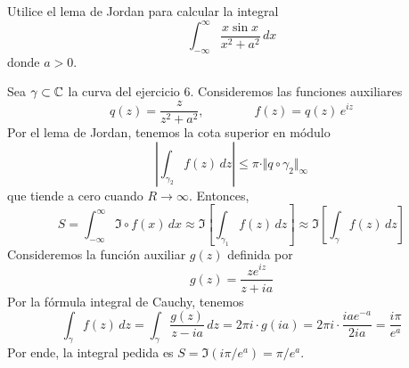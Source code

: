 \begin{exercise}
Utilice el lema de Jordan para calcular la integral
$$\int_{-\infty}^\infty \frac {x \sin x} {x^2 + a^2} \, dx$$
donde $a > 0$.
\end{exercise}

\begin{solution}
Sea $\gamma \subset \mathbb C$ la curva del ejercicio 6. Consideremos las funciones auxiliares
$$q(z) = \frac z {z^2 + a^2}, \qquad \qquad f(z) = q(z) \, e^{iz}$$
Por el lema de Jordan, tenemos la cota superior en módulo
$$\left| \int_{\gamma_2} f(z) \, dz \right| \le \pi \cdot \Vert q \circ \gamma_2 \Vert_\infty$$
que tiende a cero cuando $R \to \infty$. Entonces,
$$
S
    = \int_{-\infty}^\infty \Im \circ f(x) \, dx
    \approx \Im \left[ \int_{\gamma_1} f(z) \, dz \right]
    \approx \Im \left[ \int_\gamma f(z) \, dz \right]$$
Consideremos la función auxiliar $g(z)$ definida por
$$
g(z) = \frac {ze^{iz}} {z + ia}
$$
Por la fórmula integral de Cauchy, tenemos
$$
\int_\gamma f(z) \, dz
    = \int_\gamma \frac {g(z)} {z - ia} \, dz
    = 2\pi i \cdot g(ia)
    = 2\pi i \cdot \frac {iae^{-a}} {2ia}
    = \frac {i\pi} {e^a}
$$
Por ende, la integral pedida es $S = \Im(i\pi/e^a) = \pi/e^a$.
\end{solution}
